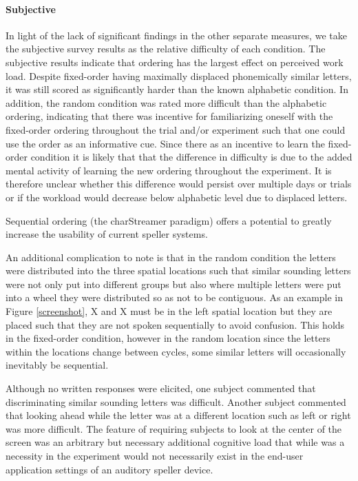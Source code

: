 \documentclass[12pt]{article}
\begin{document}
\paragraph{Subjective}
In light of the lack of significant findings in the other separate
measures, we take the subjective survey results as the relative
difficulty of each condition.  The subjective results indicate that
ordering has the largest effect on perceived work load. Despite
fixed-order having maximally displaced phonemically similar letters,
it was still scored as significantly harder than the known
alphabetic condition.  In addition, the random condition was rated
more difficult than the alphabetic ordering, indicating that there
was incentive for familiarizing oneself with the fixed-order
ordering throughout the trial and/or experiment such that one could
use the order as an informative cue.  Since there as an incentive to
learn the fixed-order condition it is likely that that the
difference in difficulty is due to the added mental activity of
learning the new ordering throughout the experiment. It is therefore
unclear whether this difference would persist over multiple days or
trials or if the workload would decrease below alphabetic level due
to displaced letters.

Sequential ordering (the charStreamer paradigm) offers a potential to
greatly increase the usability of current speller systems.

An additional complication to note is that in the
random condition the letters were distributed into the three
spatial locations such that similar sounding letters were not only
put into different groups but also where multiple letters were put
into a wheel they were distributed so as not to be contiguous.  As
an example in Figure \ref{screenshot}, X and X must be in the left
spatial location but they are placed such that they are not spoken
sequentially to avoid confusion.  This holds in the fixed-order
condition, however in the random location since the letters within
the locations change between cycles, some similar letters will
occasionally inevitably be sequential. 

Although no written responses were elicited, one subject commented
that discriminating similar sounding letters was difficult.  Another
subject commented that looking ahead while the letter was at a
different location such as left or right was more difficult.  The
feature of requiring subjects to look at the center of the screen
was an arbitrary but necessary additional cognitive load that while
was a necessity in the experiment would not necessarily exist in the
end-user application settings of an auditory speller device.
\end{document}
